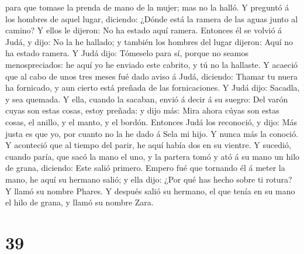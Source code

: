 para que tomase la prenda de mano de la mujer; mas no la halló.
 Y preguntó á los hombres de aquel lugar, diciendo:
¿Dónde está la ramera de las aguas junto al camino? Y ellos le dijeron:
No ha estado aquí ramera.  Entonces él se volvió á Judá,
y dijo: No la he hallado; y también los hombres del lugar dijeron: Aquí
no ha estado ramera.  Y Judá dijo: Tómeselo para sí,
porque no seamos menospreciados: he aquí yo he enviado este cabrito, y
tú no la hallaste.  Y acaeció que al cabo de unos tres
meses fué dado aviso á Judá, diciendo: Thamar tu nuera ha fornicado, y
aun cierto está preñada de las fornicaciones. Y Judá dijo: Sacadla, y
sea quemada.  Y ella, cuando la sacaban, envió á decir á
su suegro: Del varón cuyas son estas cosas, estoy preñada: y dijo más:
Mira ahora cúyas son estas cosas, el anillo, y el manto, y el bordón.
 Entonces Judá los reconoció, y dijo: Más justa es que
yo, por cuanto no la he dado á Sela mi hijo. Y nunca más la conoció.
 Y aconteció que al tiempo del parir, he aquí había dos
en su vientre.  Y sucedió, cuando paría, que sacó la mano
el uno, y la partera tomó y ató á su mano un hilo de grana, diciendo:
Este salió primero.  Empero fué que tornando él á meter
la mano, he aquí su hermano salió; y ella dijo: ¿Por qué has hecho sobre
ti rotura? Y llamó su nombre Phares.  Y después salió su
hermano, el que tenía en su mano el hilo de grana, y llamó su nombre
Zara.

\hypertarget{section-38}{%
\section{39}\label{section-38}}

